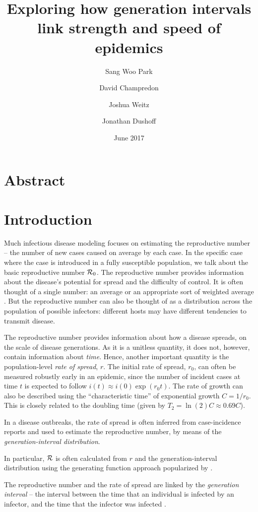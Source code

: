 \documentclass[12pt,]{article}
\title{Exploring how generation intervals link strength and speed of epidemics}
\author{Sang Woo Park \and David Champredon \and Joshua Weitz \and Jonathan Dushoff}
\date{June 2017}
\newcommand{\RR}{\ensuremath{{\cal R}}}
\newcommand{\Rx}[1]{\ensuremath{{\cal R}_{#1}}}
\newcommand{\Ro}{\Rx{0}}
\newcommand{\Tc}{\ensuremath{C}}
\begin{document}
\maketitle

\section*{Abstract}

\section{Introduction}

Much infectious disease modeling focuses on estimating the reproductive number -- the number of new cases caused on average by each case.
In the specific case where the case is introduced in a fully susceptible population, we talk about the basic reproductive number \Ro.
The reproductive number provides information about the disease's potential for spread and the difficulty of control.
It is often thought of a single number: an average \cite{AndeMay91} or an appropriate sort of weighted average \cite{DiekHees90}.
But the reproductive number can also be thought of as a distribution across the population of possible infectors: different hosts may have different tendencies to transmit disease.

The reproductive number provides information about how a disease spreads, on the scale of disease generations.
As it is a unitless quantity, it does not, however, contain information about \emph{time}.
Hence, another important quantity is the population-level \emph{rate of spread}, $r$. The initial rate of spread, $r_0$, can often be measured robustly early in an epidemic, since the number of incident cases at time $t$ is expected to follow $i(t) \approx i(0) \exp(r_0t)$. The rate of growth can also be described using the ``characteristic time'' of exponential growth $\Tc = 1/r_0$. This is closely related to the doubling time (given by $T_2 = \ln(2) \Tc \approx 0.69 \Tc$).

In a disease outbreaks, the rate of spread is often inferred from case-incidence reports and used to estimate the reproductive number, by means of the \emph{generation-interval distribution}.

In particular, $\RR$ is often calculated from $r$ and the generation-interval distribution using the generating function approach popularized by \cite{WallLips07}.

The reproductive number and the rate of spread are linked by the \emph{generation interval} -- the interval between the time that an individual is infected by an infector, and the time that the infector was infected \cite{Sven07}.
\end{document}
